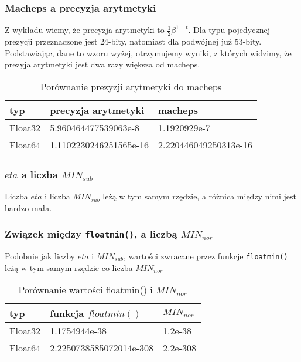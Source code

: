 \documentclass{article}
\begin{document}
\subsubsection{Macheps a precyzja arytmetyki}

Z wykładu wiemy, że  precyzja arytmetyki to \( \frac{1}{2} \beta^{1-t}\). Dla typu pojedycznej prezycji przeznaczone jest 24-bity, natomiast dla podwójnej już 53-bity. Podstawiając, dane to wzoru wyżej, otrzymujemy wyniki, z których widzimy, że prezyja arytmetyki jest dwa razy większa od macheps.

\begin{table}[h!]
    \centering
    \begin{tabular}{|l|l|l|}
     \hline
     typ & precyzja arytmetyki & macheps  \\
     \hline
     Float32 & 5.960464477539063e-8 & 1.1920929e-7 \\
     Float64 & 1.1102230246251565e-16 & 2.220446049250313e-16 \\
     \hline
    \end{tabular}
    \caption{Porównanie prezyzji arytmetyki do macheps}
    \label{table:4}
\end{table}

\subsubsection{\(eta\) a liczba \(MIN_{sub}\)}

Liczba \(eta\) i liczba \(MIN_{sub}\) leżą w tym samym rzędzie, a różnica między nimi jest bardzo mała.

\subsubsection{Związek między \texttt{floatmin()}, a liczbą \(MIN_{nor}\)}

Podobnie jak liczby \(eta\) i \(MIN_{sub}\), wartości zwracane przez funkcje \texttt{floatmin()} leżą w tym samym rzędzie co liczba \(MIN_{nor}\)

\begin{table}[h!]
    \centering
    \begin{tabular}{|l|l|l|}
     \hline
     typ & funkcja \(floatmin()\) & \(MIN_{nor}\)  \\
     \hline
     Float32 & 1.1754944e-38 & 1.2e-38 \\
     Float64 & 2.2250738585072014e-308 & 2.2e-308 \\
     \hline
    \end{tabular}
    \caption{Porównanie wartości floatmin() i \(MIN_{nor}\)}
    \label{table:5}
\end{table}
\end{document}
